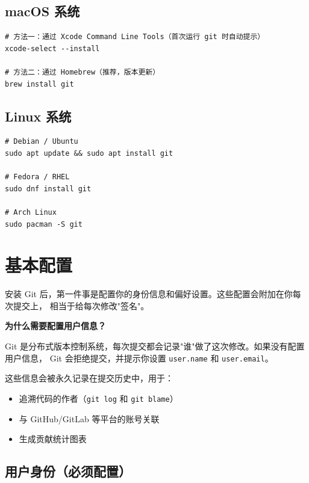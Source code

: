 \documentclass[12pt,a4paper,openany]{ctexbook}
\begin{document}
\subsection{macOS 系统}

\begin{lstlisting}[style=shell]
# 方法一：通过 Xcode Command Line Tools（首次运行 git 时自动提示）
xcode-select --install

# 方法二：通过 Homebrew（推荐，版本更新）
brew install git
\end{lstlisting}

\subsection{Linux 系统}

\begin{lstlisting}[style=shell]
# Debian / Ubuntu
sudo apt update && sudo apt install git

# Fedora / RHEL
sudo dnf install git

# Arch Linux
sudo pacman -S git
\end{lstlisting}

\section{基本配置}

安装 Git 后，第一件事是配置你的身份信息和偏好设置。这些配置会附加在你每次提交上，
相当于给每次修改"签名"。

\begin{infobox}
\textbf{为什么需要配置用户信息？}

Git 是分布式版本控制系统，每次提交都会记录"谁"做了这次修改。如果没有配置用户信息，
Git 会拒绝提交，并提示你设置 \texttt{user.name} 和 \texttt{user.email}。

这些信息会被永久记录在提交历史中，用于：
\begin{itemize}
  \item 追溯代码的作者（\texttt{git log} 和 \texttt{git blame}）
  \item 与 GitHub/GitLab 等平台的账号关联
  \item 生成贡献统计图表
\end{itemize}
\end{infobox}

\subsection{用户身份（必须配置）}
\end{document}
